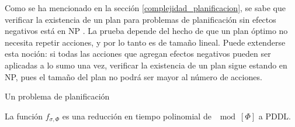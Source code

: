 Como se ha mencionado en la sección \ref{complejidad_planificacion}, 
se sabe que verificar la existencia de un plan para 
problemas de planificación
sin efectos negativos está en NP \citep{bylander:plan-complexity}. La prueba
depende del hecho de que un plan óptimo no necesita repetir acciones, y por lo
tanto es de tamaño lineal. Puede extenderse esta noción: si todas las acciones que
agregan efectos negativos pueden ser aplicadas a lo sumo una vez, verificar la
existencia de un plan sigue estando en NP, pues el tamaño del plan no podrá ser
mayor al número de acciones.

\begin{definition}
Un problema de planificación 
\end{definition}


\begin{theorem}
La función $f_{\sigma, \Phi}$ es una reducción en tiempo polinomial de $\mod[\Phi]$
a PDDL.
\end{theorem}

